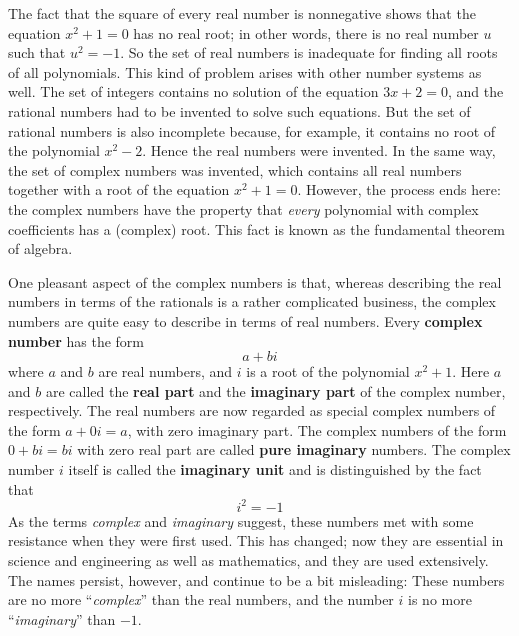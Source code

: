 
The fact that the square of every real number is nonnegative shows that the equation $x^{2} + 1 = 0$ has no real root; in other words, there is no real number $u$ such that $u^{2} = -1$. So the set of real numbers is inadequate for finding all roots of all polynomials. This kind of problem arises with other number systems as well. The set of integers contains no solution of the equation $3x + 2 = 0$, and the rational numbers had to be invented to solve such 
equations. But the set of rational numbers is also incomplete because, 
for example, it contains no root of the polynomial $x^{2} - 2$. Hence the real numbers were invented. In the same way, the set of 
complex numbers was invented, which contains all real numbers together 
with a root of the equation $x^{2} + 1 = 0$. However, the process ends here: the complex numbers have the property that \textit{every} polynomial with complex coefficients has a (complex) root. This fact is known as the fundamental theorem of algebra.


One pleasant aspect of the complex 
numbers is that, whereas describing the real numbers in terms of the 
rationals is a rather complicated business, the complex numbers are 
quite easy to describe in terms of real numbers. Every \textbf{complex number} has the form
\begin{equation*}
a + bi
\end{equation*}
where $a$ and $b$ are real numbers, and $i$ is a root of the polynomial $x^{2} + 1$. Here $a$ and $b$ are called the \textbf{real part} and the \textbf{imaginary part} of the complex number, respectively. The real numbers are now regarded as special complex numbers of the form $a + 0i = a$, with zero imaginary part. The complex numbers of the form $0 + bi = bi$ with zero real part are called \textbf{pure imaginary} numbers. The complex number $i$ itself is called the \textbf{imaginary unit} and is distinguished by the fact that
\begin{equation*}
i^2 = -1 
\end{equation*}
As the terms \textit{complex} and \textit{imaginary}
 suggest, these numbers met with some resistance when they were first 
used. This has changed; now they are essential in science and 
engineering as well as mathematics, and they are used extensively. The 
names persist, however, and continue to be a bit misleading: These 
numbers are no more ``\textit{complex}'' than the real numbers, and the number $i$ is no more ``\textit{imaginary}'' than $-1$.


